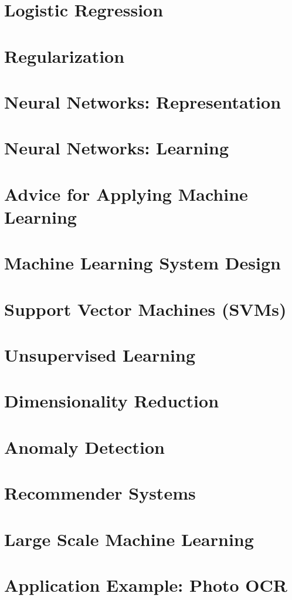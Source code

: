 \documentclass{article}
\begin{document}
    \pagebreak
    \section{Logistic Regression}


    \section{Regularization}
    \section{Neural Networks: Representation}
    \section{Neural Networks: Learning}
    \section{Advice for Applying Machine Learning}
    \section{Machine Learning System Design}
    \section{Support Vector Machines (SVMs)}
    \section{Unsupervised Learning}
    \section{Dimensionality Reduction}
    \section{Anomaly Detection}
    \section{Recommender Systems}
    \section{Large Scale Machine Learning}
    \section{Application Example: Photo OCR}
\end{document}
